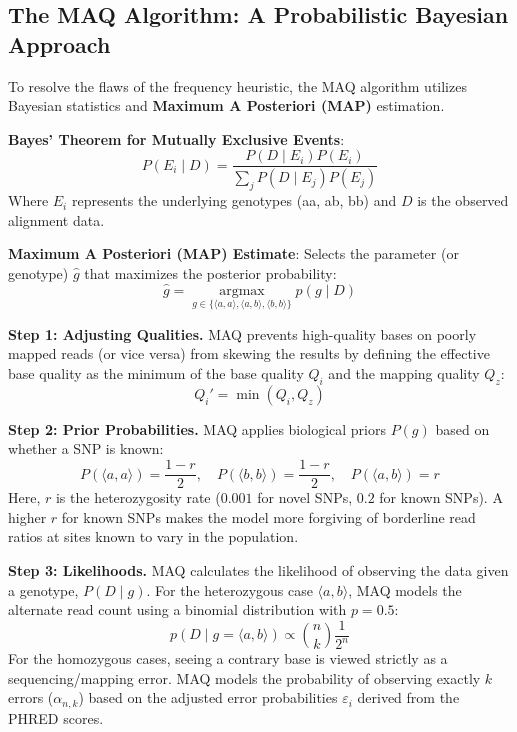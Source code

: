 \documentclass[11pt,a4paper]{article}
\begin{document}
\subsection{The MAQ Algorithm: A Probabilistic Bayesian Approach}
To resolve the flaws of the frequency heuristic, the MAQ algorithm utilizes Bayesian statistics and \textbf{Maximum A Posteriori (MAP)} estimation.

\begin{important}
    \textbf{Bayes' Theorem for Mutually Exclusive Events}:
    \[
    P(E_i \mid D) = \frac{P(D \mid E_i) P(E_i)}{\sum_j P(D \mid E_j) P(E_j)}
    \]
    Where $E_i$ represents the underlying genotypes (aa, ab, bb) and $D$ is the observed alignment data.
\end{important}

\begin{important}
    \textbf{Maximum A Posteriori (MAP) Estimate}: Selects the parameter (or genotype) $\hat{g}$ that maximizes the posterior probability:
    \[
    \hat{g} = \underset{g \in \{\langle a,a\rangle, \langle a,b\rangle, \langle b,b\rangle\}}{\operatorname{argmax}} p(g \mid D)
    \]
\end{important}

\textbf{Step 1: Adjusting Qualities.} MAQ prevents high-quality bases on poorly mapped reads (or vice versa) from skewing the results by defining the effective base quality as the minimum of the base quality $Q_i$ and the mapping quality $Q_z$:
\[
Q_i' = \min(Q_i, Q_z)
\]

\textbf{Step 2: Prior Probabilities.} MAQ applies biological priors $P(g)$ based on whether a SNP is known:
\[
P(\langle a,a\rangle) = \frac{1-r}{2}, \quad P(\langle b,b\rangle) = \frac{1-r}{2}, \quad P(\langle a,b\rangle) = r
\]
Here, $r$ is the heterozygosity rate ($0.001$ for novel SNPs, $0.2$ for known SNPs). A higher $r$ for known SNPs makes the model more forgiving of borderline read ratios at sites known to vary in the population.

\textbf{Step 3: Likelihoods.} MAQ calculates the likelihood of observing the data given a genotype, $P(D \mid g)$.
For the heterozygous case $\langle a,b\rangle$, MAQ models the alternate read count using a binomial distribution with $p=0.5$:
\[
p(D \mid g=\langle a,b\rangle) \propto \binom{n}{k} \frac{1}{2^n}
\]
For the homozygous cases, seeing a contrary base is viewed strictly as a sequencing/mapping error. MAQ models the probability of observing exactly $k$ errors ($\alpha_{n,k}$) based on the adjusted error probabilities $\varepsilon_i$ derived from the PHRED scores.
\end{document}

